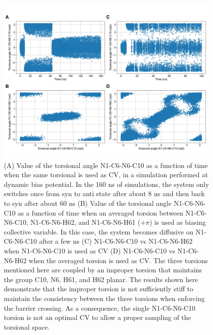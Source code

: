 \documentclass[journal=jacsat,manuscript=article]{achemso}
\begin{document}
\renewcommand{\thefigure}{S\arabic{figure}}
\begin{figure}[H]
    \centering
    \includegraphics[width=\textwidth]{Figures/m6A_sampling.jpg}   
    \caption{(A) Value of the torsional angle N1-C6-N6-C10 as a function of time when the same torsional is used as CV, in a simulation performed at dynamic bias potential. In the 160 ns of simulations, the system only switches once from syn to anti state after about 8 ns and then back to syn after about 60 ns (B) Value of the torsional angle N1-C6-N6-C10 as a function of time when an averaged torsion between  N1-C6-N6-C10,  N1-C6-N6-H62, and  N1-C6-N6-H61 ($+ \pi$) is used as biasing collective variable. In this case, the system becomes diffusive on  N1-C6-N6-C10 after a few ns (C)  N1-C6-N6-C10 vs  N1-C6-N6-H62 when  N1-C6-N6-C10 is used as CV (D) N1-C6-N6-C10 vs  N1-C6-N6-H62 when the averaged torsion is used as CV. The three torsions mentioned here are coupled by an improper torsion that maintains the group C10, N6, H61, and H62 planar. The results shown here demonstrate that the improper torsion is not sufficiently stiff to maintain the consistency between the three torsions when enforcing the barrier crossing. As a consequence, the single N1-C6-N6-C10 torsion is not an optimal CV to allow a proper sampling of the torsional space.}
    \label{sampling}
\end{figure}


\clearpage
%

\end{document}
